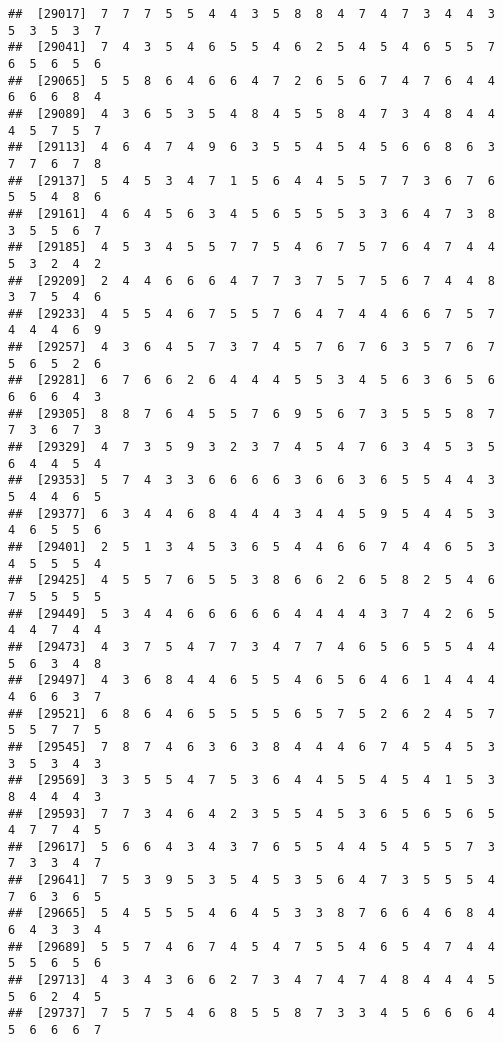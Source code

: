 \documentclass[
]{book}
\begin{document}
\begin{verbatim}
##  [29017]  7  7  7  5  5  4  4  3  5  8  8  4  7  4  7  3  4  4  3  5  3  5  3  7
##  [29041]  7  4  3  5  4  6  5  5  4  6  2  5  4  5  4  6  5  5  7  6  5  6  5  6
##  [29065]  5  5  8  6  4  6  6  4  7  2  6  5  6  7  4  7  6  4  4  6  6  6  8  4
##  [29089]  4  3  6  5  3  5  4  8  4  5  5  8  4  7  3  4  8  4  4  4  5  7  5  7
##  [29113]  4  6  4  7  4  9  6  3  5  5  4  5  4  5  6  6  8  6  3  7  7  6  7  8
##  [29137]  5  4  5  3  4  7  1  5  6  4  4  5  5  7  7  3  6  7  6  5  5  4  8  6
##  [29161]  4  6  4  5  6  3  4  5  6  5  5  5  3  3  6  4  7  3  8  3  5  5  6  7
##  [29185]  4  5  3  4  5  5  7  7  5  4  6  7  5  7  6  4  7  4  4  5  3  2  4  2
##  [29209]  2  4  4  6  6  6  4  7  7  3  7  5  7  5  6  7  4  4  8  3  7  5  4  6
##  [29233]  4  5  5  4  6  7  5  5  7  6  4  7  4  4  6  6  7  5  7  4  4  4  6  9
##  [29257]  4  3  6  4  5  7  3  7  4  5  7  6  7  6  3  5  7  6  7  5  6  5  2  6
##  [29281]  6  7  6  6  2  6  4  4  4  5  5  3  4  5  6  3  6  5  6  6  6  6  4  3
##  [29305]  8  8  7  6  4  5  5  7  6  9  5  6  7  3  5  5  5  8  7  7  3  6  7  3
##  [29329]  4  7  3  5  9  3  2  3  7  4  5  4  7  6  3  4  5  3  5  6  4  4  5  4
##  [29353]  5  7  4  3  3  6  6  6  6  3  6  6  3  6  5  5  4  4  3  5  4  4  6  5
##  [29377]  6  3  4  4  6  8  4  4  4  3  4  4  5  9  5  4  4  5  3  4  6  5  5  6
##  [29401]  2  5  1  3  4  5  3  6  5  4  4  6  6  7  4  4  6  5  3  4  5  5  5  4
##  [29425]  4  5  5  7  6  5  5  3  8  6  6  2  6  5  8  2  5  4  6  7  5  5  5  5
##  [29449]  5  3  4  4  6  6  6  6  6  4  4  4  4  3  7  4  2  6  5  4  4  7  4  4
##  [29473]  4  3  7  5  4  7  7  3  4  7  7  4  6  5  6  5  5  4  4  5  6  3  4  8
##  [29497]  4  3  6  8  4  4  6  5  5  4  6  5  6  4  6  1  4  4  4  4  6  6  3  7
##  [29521]  6  8  6  4  6  5  5  5  5  6  5  7  5  2  6  2  4  5  7  5  5  7  7  5
##  [29545]  7  8  7  4  6  3  6  3  8  4  4  4  6  7  4  5  4  5  3  3  5  3  4  3
##  [29569]  3  3  5  5  4  7  5  3  6  4  4  5  5  4  5  4  1  5  3  8  4  4  4  3
##  [29593]  7  7  3  4  6  4  2  3  5  5  4  5  3  6  5  6  5  6  5  4  7  7  4  5
##  [29617]  5  6  6  4  3  4  3  7  6  5  5  4  4  5  4  5  5  7  3  7  3  3  4  7
##  [29641]  7  5  3  9  5  3  5  4  5  3  5  6  4  7  3  5  5  5  4  7  6  3  6  5
##  [29665]  5  4  5  5  5  4  6  4  5  3  3  8  7  6  6  4  6  8  4  6  4  3  3  4
##  [29689]  5  5  7  4  6  7  4  5  4  7  5  5  4  6  5  4  7  4  4  5  5  6  5  6
##  [29713]  4  3  4  3  6  6  2  7  3  4  7  4  7  4  8  4  4  4  5  5  6  2  4  5
##  [29737]  7  5  7  5  4  6  8  5  5  8  7  3  3  4  5  6  6  6  4  5  6  6  6  7

\end{verbatim}
\end{document}
